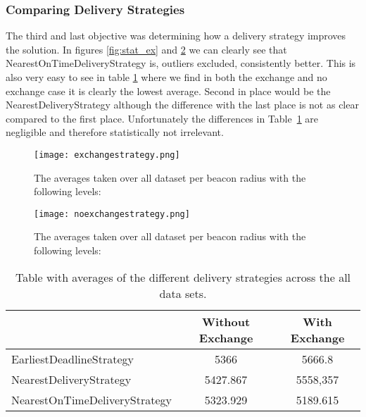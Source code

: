 \documentclass[../main.tex]{subfiles}
\begin{document}
\subsubsection{Comparing Delivery Strategies}
The third and last objective was determining how a delivery strategy improves the solution.
In figures \ref{fig:stat_ex} and \ref{fig:strat_noex} we can clearly see that NearestOnTimeDeliveryStrategy is, outliers excluded, consistently better.
This is also very easy to see in table \ref{tab:avgstrat} where we find in both the exchange and no exchange case it is clearly the lowest average.
Second in place would be the NearestDeliveryStrategy although the difference with the last place is not as clear compared to the first place. Unfortunately the differences in Table~\ref{tab:avgstrat} are negligible and therefore statistically not irrelevant.
\begin{figure}
	\centering
	\texttt{[image: exchangestrategy.png]}
	\caption{The averages taken over all dataset per beacon radius with the following levels:}
	\label{fig:strat_ex}
\end{figure}

\begin{figure}
	\centering
	\texttt{[image: noexchangestrategy.png]}
	\caption{The averages taken over all dataset per beacon radius with the following levels:}
	\label{fig:strat_noex}
\end{figure}
\begin{table}
\begin{tabular}{lcc}
	\toprule
	& Without Exchange & With Exchange \\
	\midrule
	EarliestDeadlineStrategy & 5366 & 5666.8 \\
	NearestDeliveryStrategy & 5427.867 & 5558,357 \\
	NearestOnTimeDeliveryStrategy & 5323.929 & 5189.615 \\
	\bottomrule
\end{tabular}
\caption{Table with averages of the different delivery strategies across the all data sets.}
\label{tab:avgstrat}
\end{table}
\end{document}
